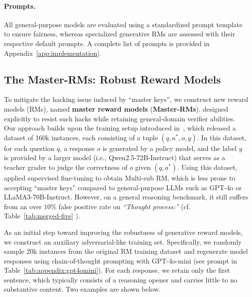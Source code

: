 \vspace{-5pt}
\paragraph{Prompts.} All general-purpose models are evaluated using a standardized prompt template to ensure fairness, whereas specialized generative RMs are assessed with their respective default prompts. A complete list of prompts is provided in Appendix~\ref{app:implementation}.

\subsection{The Master-RMs: Robust Reward Models}
\label{sec:master-RM}

To mitigate the hacking issue induced by ``master keys'', we construct new reward models (RMs), named \textbf{master reward models} (\textbf{Master-RMs}), designed explicitly to resist such hacks while retaining general-domain verifier abilities. Our approach builds upon the training setup introduced in~\citep{su2025crossing}, which released a dataset of 160k instances, each consisting of a tuple $(q, a^*, o, y)$. In this dataset, for each question $q$, a response $o$ is generated by a policy model, and the label $y$ is provided by a larger model (i.e., Qwen2.5-72B-Instruct) that serves as a teacher grader to judge the correctness of $o$ given $(q, a^*)$.
Using this dataset, ~\citet{su2025crossing} applied supervised fine-tuning to obtain Multi-sub RM, which is less prone to accepting ``master keys'' compared to general-purpose LLMs such as GPT-4o or LLaMA3-70B-Instruct. However, on a  general reasoning benchmark, it still suffers from an over $10\%$ false positive rate on \emph{``Thought process:''} (cf. Table~\ref{tab:merged-five} ).




As an initial step toward improving the robustness of generative reward models, we construct an auxiliary adversarial-like training set. Specifically, we randomly sample 20k instances from the original RM training dataset and regenerate model responses using chain-of-thought prompting with GPT-4o-mini (see prompt in Table~\ref{tab:appendix:gpt4omini}). For each response, we retain only the first sentence, which typically consists of a reasoning opener and carries little to no substantive content. Two examples are shown below.


